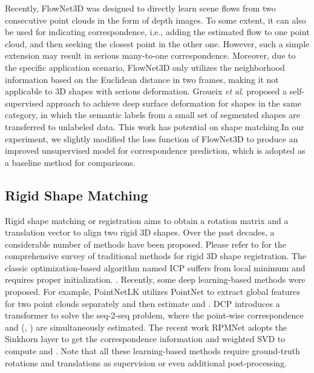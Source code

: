 \documentclass[final]{cvpr}
\begin{document}
Recently, FlowNet3D \cite{liu2019flownet3d} was designed to 
directly learn scene flows from two consecutive point clouds in the form of depth images. To some extent, it can also be used for indicating correspondence, i.e., adding the estimated flow to one point cloud, and then seeking the closest point in the other one. 
However, such a simple extension may result in serious many-to-one correspondence. Moreover, due to the specific application scenario, FlowNet3D only utilizes the neighborhood information based on the Euclidean distance in two frames,
making it not applicable to 3D shapes with serious deformation. 
Groueix \textit{et al}. \cite{groueix2019unsupervised} proposed a self-supervised approach to achieve deep surface deformation for shapes in the same category, in which the semantic labels from a small set of segmented shapes are transferred to unlabeled data. This work has potential on shape matching.In our experiment, we slightly modified the loss function of FlowNet3D to produce an improved unsupervised model for correspondence prediction, which is adopted as a baseline method for comparisons.













\subsection{Rigid Shape Matching}


Rigid shape matching or registration aims to obtain a rotation matrix  and a translation vector  to align two rigid 3D shapes. Over the past decades, a considerable number of methods have been proposed. Please refer to \cite{Tam2013registrationsurey} for the comprehensive survey of traditional methods for rigid 3D shape registration.
The classic optimization-based algorithm named ICP \cite{besl1992method} suffers from local minimum and requires proper initialization. . 
\fi
Recently, some deep learning-based methods were proposed. For example, PointNetLK \cite{aoki2019pointnetlk} 
utilizes PointNet \cite{qi2017pointnet} to extract global features for two point clouds separately and then estimate  and . DCP \cite{wang2019deep} introduces a transformer \cite{NIPS2017_7181} to solve the seq-2-seq problem, where the point-wise correspondence and (, ) are simultaneously estimated.
The recent work RPMNet \cite{yew2020rpm} 
adopts the Sinkhorn layer \cite{mena2018learning} to 
get the correspondence information and  weighted 
SVD \cite{golub1971singular} to compute  and .
Note that all these learning-based methods require ground-truth rotations and translations as supervision or even additional post-processing.
\end{document}
